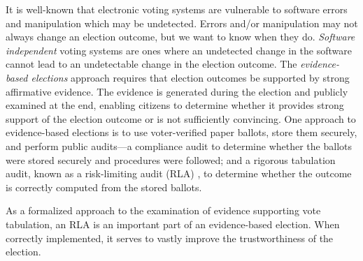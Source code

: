 It is well-known that electronic voting systems are vulnerable to software errors and manipulation which may be undetected. Errors and/or manipulation may not always change an election outcome, but we want to know when they do. {\em Software independent} voting systems \cite{SI-Wack,rivest2008notion} are ones where an undetected change in the software cannot lead to an undetectable change in the election outcome. The {\em evidence-based elections} \cite{evidence-based} approach requires that election outcomes be supported by strong affirmative evidence. The evidence is generated during the election and publicly examined at the end, enabling citizens to determine whether it provides strong support of the election outcome or is not sufficiently convincing. 
One approach to evidence-based elections is to use voter-verified paper ballots, store them securely, and perform public audits---a compliance audit to determine whether the ballots were stored securely and procedures were followed; and a rigorous tabulation audit, known as a risk-limiting audit (RLA) \cite{RLA}, to determine whether the outcome is correctly computed from the stored ballots.  

As a formalized approach to the examination of evidence supporting vote tabulation, an RLA is an important part of an evidence-based election. When correctly implemented, it serves to vastly improve the trustworthiness of the election. 


